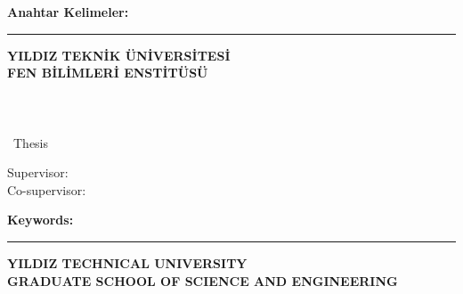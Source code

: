 \abstractTextTurkish

{\bfseries Anahtar Kelimeler:} \abstractKeywordsTurkish

\vfill


\begin{center}
\rule{0.8\textwidth}{.1pt}

\bfseries \small
 YILDIZ TEKNİK ÜNİVERSİTESİ\\
 FEN BİLİMLERİ ENSTİTÜSÜ
\end{center}

\newpage
\chapter*{\eabstract}

\begin{center}
{\bfseries \Large\titleEN}

\student

\departmentEN \\ {\degree~Thesis}

Supervisor: \advisorEN \\
\ifnum{}
Co-supervisor: \coadvisorEN
\fi  


\end{center}

\abstractTextEnglish

{\bfseries Keywords:} \abstractKeywordsEnglish

\vfill


\begin{center}
\rule{0.8\textwidth}{.1pt}
    
\bfseries \small
 YILDIZ TECHNICAL UNIVERSITY\\
 GRADUATE SCHOOL OF SCIENCE AND ENGINEERING
\end{center}

\fi
\fi


\onehalfspacing
\clearpage
{}